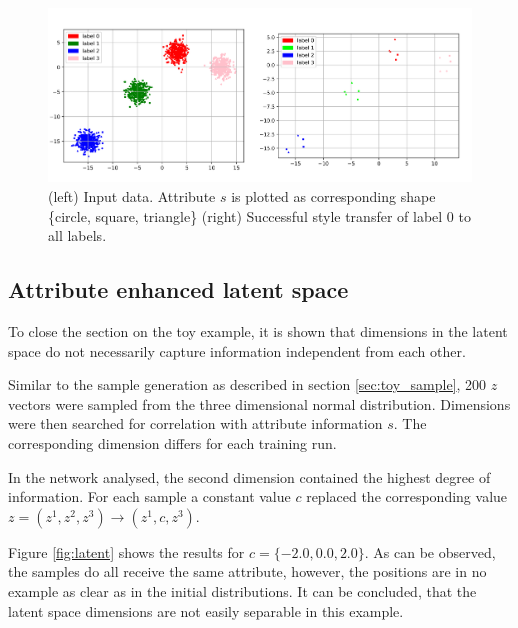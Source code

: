 \documentclass[final]{cvpr}
\begin{document}
\begin{figure}[t]
	\begin{center}
		\includegraphics[width=1.0\linewidth]{./figs/toy/with_style/combined_style_transfer.png}
	\end{center}
	\caption{(left) Input data. Attribute $s$ is plotted as corresponding shape \{circle, square, triangle\} (right) Successful style transfer of label 0 to all labels.}
	\label{fig:toy_style}
\end{figure}

\subsection{Attribute enhanced latent space}
To close the section on the toy example, it is shown that dimensions in the latent space do not necessarily capture information independent from each other. 

Similar to the sample generation as described in section \ref{sec:toy_sample}, 200 $z$ vectors were sampled from the three dimensional normal distribution.
Dimensions were then searched for correlation with attribute information $s$. The corresponding dimension differs for each training run. 

In the network analysed, the second dimension contained the highest degree of information. For each sample a constant value $c$ replaced the corresponding value $z = (z^1, z^2, z^3) \rightarrow (z^1, c, z^3)$.

Figure \ref{fig:latent} shows the results for $c = \{-2.0, 0.0, 2.0\}$. As can be observed, the samples do all receive the same attribute, however, the positions are in no example as clear as in the initial distributions.
It can be concluded, that the latent space dimensions are not easily separable in this example.
\end{document}
